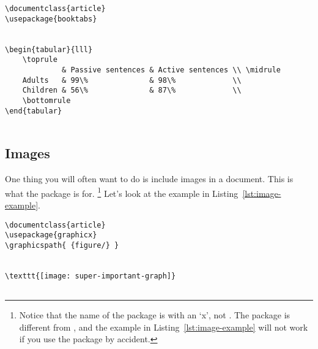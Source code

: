\begin{listing}[htbp]
	\centering
	\begin{verbatim}
\documentclass{article}
\usepackage{booktabs}


\begin{tabular}{lll}
    \toprule
             & Passive sentences & Active sentences \\ \midrule
    Adults   & 99\%              & 98\%             \\
    Children & 56\%              & 87\%             \\
    \bottomrule
\end{tabular}


	\end{verbatim}
	\caption{A table in \LaTeX{} using the package }
	\label{lst:booktabs-table}
\end{listing}

\subsection{Images}
\label{subsec:images}

One thing you will often want to do is include images in a document.
This is what the package  is for.%
\footnote{%
Notice that the name of the package is  with an `x', not .
The  package is different from , and the example in Listing~\ref{lst:image-example} will not work if you use the  package by accident.%
}
Let's look at the example in Listing~\ref{lst:image-example}.

\begin{listing}[htbp]
	\centering
	\begin{verbatim}
\documentclass{article}
\usepackage{graphicx}
\graphicspath{ {figure/} }


\texttt{[image: super-important-graph]}


	\end{verbatim}
	\caption{An example of including an image in a document}
	\label{lst:image-example}
\end{listing}

